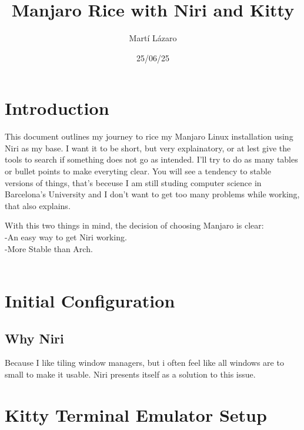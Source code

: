 \documentclass{article}
\title{Manjaro Rice with Niri and Kitty}
\author{Martí Lázaro}
\date{25/06/25}
\begin{document}
\maketitle

\section*{Introduction}
This document outlines my journey to rice my Manjaro Linux installation using Niri as my base.
I want it to be short, but very explainatory, or at lest give the tools to search if something does not go as intended.
I'll try to do as many tables or bullet points to make everyting clear.
You will see a tendency to stable versions of things, that's beceuse I am still studing computer science in Barcelona's University
and I don't want to get too many problems while working, that also explains.

With this two things in mind, the decision of choosing Manjaro is clear: \\
 -An easy way to get Niri working. \\
 -More Stable than Arch. \\
\\

\tableofcontents



\section{Initial Configuration}

\subsection*{Why Niri}
Because I like tiling window managers, but i often feel like all windows are to small to make it usable.
Niri presents itself as a solution to this issue.

\section{Kitty Terminal Emulator Setup}
\end{document}
